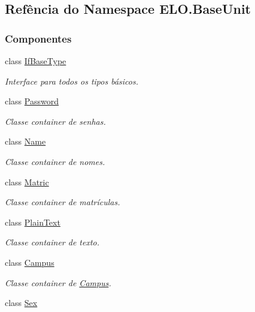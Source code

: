 \hypertarget{namespaceELO_1_1BaseUnit}{\subsection{Refência do Namespace E\-L\-O.\-Base\-Unit}
\label{namespaceELO_1_1BaseUnit}
}
\subsubsection*{Componentes}
\begin{DoxyCompactItemize}
\item 
class \hyperlink{classELO_1_1BaseUnit_1_1IfBaseType}{If\-Base\-Type}
\begin{DoxyCompactList}\small\item\em Interface para todos os tipos básicos. \end{DoxyCompactList}\item 
class \hyperlink{classELO_1_1BaseUnit_1_1Password}{Password}
\begin{DoxyCompactList}\small\item\em Classe container de senhas. \end{DoxyCompactList}\item 
class \hyperlink{classELO_1_1BaseUnit_1_1Name}{Name}
\begin{DoxyCompactList}\small\item\em Classe container de nomes. \end{DoxyCompactList}\item 
class \hyperlink{classELO_1_1BaseUnit_1_1Matric}{Matric}
\begin{DoxyCompactList}\small\item\em Classe container de matrículas. \end{DoxyCompactList}\item 
class \hyperlink{classELO_1_1BaseUnit_1_1PlainText}{Plain\-Text}
\begin{DoxyCompactList}\small\item\em Classe container de texto. \end{DoxyCompactList}\item 
class \hyperlink{classELO_1_1BaseUnit_1_1Campus}{Campus}
\begin{DoxyCompactList}\small\item\em Classe container de \hyperlink{classELO_1_1BaseUnit_1_1Campus}{Campus}. \end{DoxyCompactList}\item 
class \hyperlink{classELO_1_1BaseUnit_1_1Sex}{Sex}

\end{DoxyCompactItemize}

